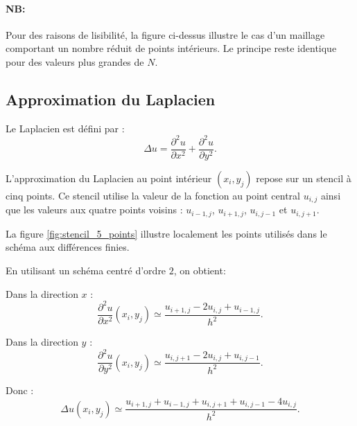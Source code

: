 \documentclass[12pt,a4paper]{article}
\begin{document}
\paragraph{NB:}Pour des raisons de lisibilité, la figure ci-dessus illustre le cas d’un maillage comportant un nombre réduit de points intérieurs. Le principe reste identique pour des valeurs plus grandes de $N$.
	
	
	
	
	
	\subsection{Approximation du Laplacien}
	
	Le Laplacien est défini par :
	\begin{equation*}
	\Delta u
	=
	\frac{\partial^2 u}{\partial x^2}
	+
	\frac{\partial^2 u}{\partial y^2}.
	\end{equation*}
	
	L'approximation du Laplacien au point intérieur $(x_i,y_j)$ repose sur un stencil
	à cinq points. Ce stencil utilise la valeur de la fonction au point central
	$u_{i,j}$ ainsi que les valeurs aux quatre points voisins :
	$u_{i-1,j}$, $u_{i+1,j}$, $u_{i,j-1}$ et $u_{i,j+1}$.
	
	La figure \ref{fig:stencil_5_points} illustre localement les points utilisés
	dans le schéma aux différences finies.
	
	En utilisant un schéma centré d'ordre \(2\), on obtient:
	
	Dans la direction \(x\) :
	\begin{equation*}
	\frac{\partial^2 u}{\partial x^2}(x_i,y_j)
	\simeq
	\frac{u_{i+1,j}-2u_{i,j}+u_{i-1,j}}{h^2}.
	\end{equation*}
	
	Dans la direction \(y\) :
	\begin{equation*}
	\frac{\partial^2 u}{\partial y^2}(x_i,y_j)
	\simeq
	\frac{u_{i,j+1}-2u_{i,j}+u_{i,j-1}}{h^2}.
	\end{equation*}
	
	Donc :
	\begin{equation*}
	\Delta u(x_i,y_j)
	\simeq
	\frac{
		u_{i+1,j}
		+
		u_{i-1,j}
		+
		u_{i,j+1}
		+
		u_{i,j-1}
		-
		4u_{i,j}
	}{h^2}.
	\end{equation*}
	
\end{document}

